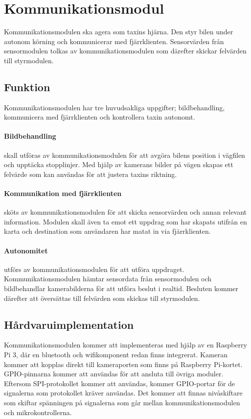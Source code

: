 \documentclass[designspec/spec.tex]{subfiles}
\begin{document}
\section{Kommunikationsmodul}
Kommunikationsmodulen ska agera som taxins hjärna. Den styr bilen under autonom
körning och kommunicerar med fjärrklienten. Sensorvärden från sensormodulen
tolkas av kommunikationsmodulen som därefter skickar felvärden till
styrmodulen.

\subsection{Funktion}
Kommunikationsmodulen har tre huvudsakliga uppgifter; bildbehandling,
kommunicera med fjärrklienten och kontrollera taxin autonomt.

\paragraph{Bildbehandling} skall utföras av kommunikationsmodulen för att
avgöra bilens position i vägfilen och upptäcka stopplinjer. Med hjälp av
kamerans bilder på vägen skapas ett felvärde som kan användas för att justera
taxins riktning.

\paragraph{Kommunikation med fjärrklienten} sköts av kommunikationsmodulen för
att skicka sensorvärden och annan relevant information. Modulen skall även ta
emot ett uppdrag som har skapats utifrån en karta och destination som
användaren har matat in via fjärrklienten.

\paragraph{Autonomitet} utförs av kommunikationsmodulen för att utföra
uppdraget. Kommunikationsmodulen hämtar sensordata från sensormodulen och
bildbehandlar kamerabilderna för att utföra beslut i realtid. Besluten kommer
därefter att översättas till felvärden som skickas till styrmodulen.

\subsection{Hårdvaruimplementation} 
Kommunikationsmodulen kommer att implementeras med hjälp av en Raspberry Pi 3,
där en bluetooth och wifikomponent redan finns integrerat. Kameran kommer att
kopplas direkt till kameraporten som finns på Raspberry Pi-kortet.
GPIO-pinnarna kommer att användas för att ansluta till övriga moduler.
Eftersom SPI-protokollet kommer att användas, kommer GPIO-portar för de
signalerna som protokollet kräver användas. Det kommer att finnas
nivåskiftare som skiftar spänningen på signalerna som går mellan
kommunikationsmodulen och mikrokontrollerna.
\end{document}
